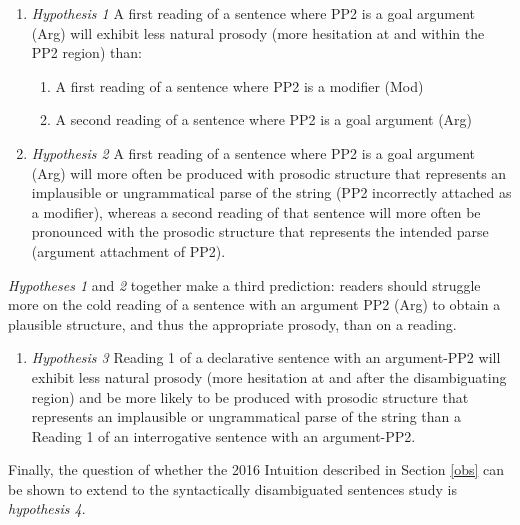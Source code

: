 \documentclass[12pt,oneside]{book}
\providecommand{\tightlist}{%
  \setlength{\itemsep}{0pt}\setlength{\parskip}{0pt}}
\begin{document}
\begin{enumerate}
\def\labelenumi{(\arabic{enumi})}
\setcounter{enumi}{37}
\tightlist
\item
  \emph{Hypothesis 1}
  A first reading of a sentence where PP2 is a goal argument (Arg) will exhibit less natural prosody (more hesitation at and within the PP2 region) than:

  \begin{enumerate}
  \def\labelenumii{\alph{enumii}.}
  \tightlist
  \item
    A first reading of a sentence where PP2 is a modifier (Mod)
  \item
    A second reading of a sentence where PP2 is a goal argument (Arg)
  \end{enumerate}
\item
  \emph{Hypothesis 2}
  A first reading of a sentence where PP2 is a goal argument (Arg) will more often be produced with prosodic structure that represents an implausible or ungrammatical parse of the string (PP2 incorrectly attached as a modifier), whereas a second reading of that sentence will more often be pronounced with the prosodic structure that represents the intended parse (argument attachment of PP2).
\end{enumerate}

\emph{Hypotheses 1} and \emph{2} together make a third prediction: readers should struggle more on the cold reading of a sentence with an argument PP2 (Arg) to obtain a plausible structure, and thus the appropriate prosody, than on a  reading.

\begin{enumerate}
\def\labelenumi{(\arabic{enumi})}
\setcounter{enumi}{39}
\tightlist
\item
  \emph{Hypothesis 3}
  Reading 1 of a declarative sentence with an argument-PP2 will exhibit less natural prosody (more hesitation at and after the disambiguating region) and be more likely to be produced with prosodic structure that represents an implausible or ungrammatical parse of the string than a Reading 1 of an interrogative sentence with an argument-PP2.
\end{enumerate}

Finally, the question of whether the 2016 Intuition described in Section \ref{obs} can be shown to extend to the syntactically disambiguated sentences  study is  \emph{hypothesis 4}. 
\end{document}

